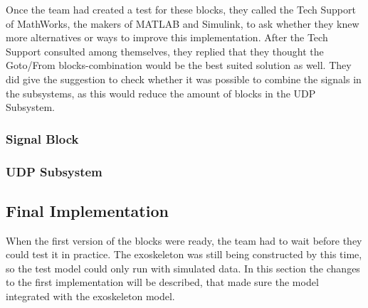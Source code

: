 Once the team had created a test for these blocks, they called the Tech Support of MathWorks, the makers of MATLAB and Simulink, to ask whether they knew more alternatives or ways to improve this implementation. After the Tech Support consulted among themselves, they replied that they thought the Goto/From blocks-combination would be the best suited solution as well. They did give the suggestion to check whether it was possible to combine the signals in the subsystems, as this would reduce the amount of blocks in the UDP Subsystem.

\subsubsection{Signal Block}
\subsubsection{UDP Subsystem}

\subsection{Final Implementation}\label{sec:simfinim}
When the first version of the blocks were ready, the team had to wait before they could test it in practice. The exoskeleton was still being constructed by this time, so the test model could only run with simulated data. In this section the changes to the first implementation will be described, that made sure the model integrated with the exoskeleton model.



